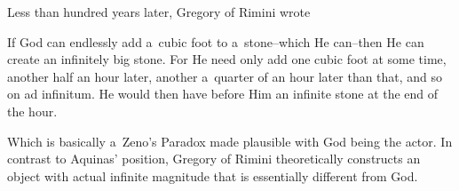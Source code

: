 \documentclass[12pt,a4paper]{article}
\begin{document}
Less than hundred years later, Gregory of Rimini wrote
\begin{displayquote}
If God can endlessly add a~cubic foot to a~stone–which He can–then He can create an infinitely big stone. For He need only add one cubic foot at some time, another half an hour later, another a~quarter of an hour later than that, and so on ad infinitum. He would then have before Him an infinite stone at the end of the hour.
\end{displayquote}
Which is basically a~Zeno's Paradox made plausible with God being the actor. In contrast to Aquinas' position, Gregory of Rimini theoretically constructs an object with actual infinite magnitude that is essentially different from God.

\
\end{document}
